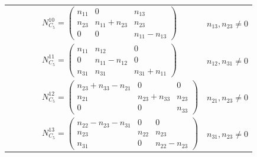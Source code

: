 \documentclass[12pt, reqno]{amsart}
\theoremstyle{plain}
\begin{document}
\begin{table}[H]
\begin{tabular}{|c|c|l|l|l|l|}
    & & & & $N_{C_5}^{10} = \begin{pmatrix} n_{11} & 0 & n_{13} \\ n_{23} & n_{11}+n_{23} & n_{23} \\ 0 & 0 & n_{11}-n_{13} \end{pmatrix}$ & $n_{13},n_{23}\neq0$ \\
    & & & & $N_{C_5}^{11} = \begin{pmatrix} n_{11} & n_{12} & 0 \\ 0 & n_{11}-n_{12} & 0 \\ n_{31} & n_{31} & n_{31}+n_{11} \end{pmatrix}$ & $n_{12},n_{31}\neq0$ \\
       & & & & $N_{C_5}^{12} = \begin{pmatrix} n_{23}+n_{33}-n_{21} & 0 & 0 \\ n_{21} & n_{23}+n_{33} & n_{23} \\ 0 & 0 & n_{33} \end{pmatrix}$ & $n_{21},n_{23}\neq0$ \\
  & & & & $N_{C_5}^{13} = \begin{pmatrix} n_{22}-n_{23}-n_{31} & 0 & 0 \\ n_{23} & n_{22} & n_{23} \\ n_{31} & 0 & n_{22}-n_{23} \end{pmatrix}$ & $n_{31},n_{23}\neq0$ \\
    \hline
    \end{tabular}
    \label{tab:nijenhuis_3d_associative}
\end{table}
\end{document}
